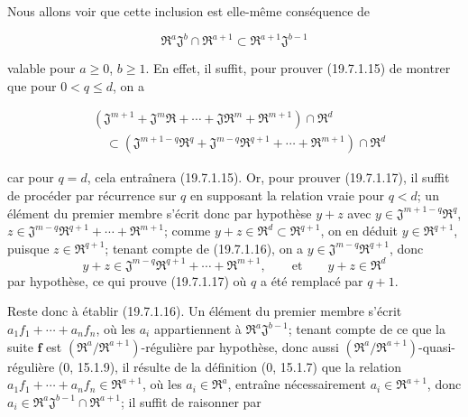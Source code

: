 Nous allons voir que cette inclusion est elle-même conséquence de
\begin{env}[19.7.1.16]
\label{IV.19.7.1.16}
\[
  \mathfrak R^a\mathfrak J^b\cap\mathfrak R^{a+1}\subset\mathfrak R^{a+1}\mathfrak J^{b-1}
\]
\end{env}
valable pour $a\geq0$, $b\geq1$. En effet, il suffit, pour prouver (19.7.1.15) de montrer que pour $0<q\leq d$, on a
\begin{env}[19.7.1.17]
\label{IV.19.7.1.17}
\[
\begin{aligned}
  &(\mathfrak J^{m+1}+\mathfrak J^m\mathfrak R+\cdots+\mathfrak J\mathfrak R^m+\mathfrak R^{m+1})\cap\mathfrak R^d\\
  &\quad\subset(\mathfrak J^{m+1-q}\mathfrak R^q+\mathfrak J^{m-q}\mathfrak R^{q+1}+\cdots+\mathfrak R^{m+1})\cap\mathfrak R^d
\end{aligned}
\]
\end{env}
car pour $q=d$, cela entraînera (19.7.1.15). Or, pour prouver (19.7.1.17), il suffit de procéder par récurrence sur $q$ en supposant la relation vraie pour $q<d$; un élément du premier membre s'écrit donc par hypothèse $y+z$ avec $y\in\mathfrak J^{m+1-q}\mathfrak R^q$, $z\in\mathfrak J^{m-q}\mathfrak R^{q+1}+\cdots+\mathfrak R^{m+1}$; comme $y+z\in\mathfrak R^d\subset\mathfrak R^{q+1}$, on en déduit $y\in\mathfrak R^{q+1}$, puisque $z\in\mathfrak R^{q+1}$; tenant compte de (19.7.1.16), on a $y\in\mathfrak J^{m-q}\mathfrak R^{q+1}$, donc
\[
  y+z\in\mathfrak J^{m-q}\mathfrak R^{q+1}+\cdots+\mathfrak R^{m+1},\qquad\text{et}\qquad y+z\in\mathfrak R^d
\]
par hypothèse, ce qui prouve (19.7.1.17) où $q$ a été remplacé par $q+1$.

Reste donc à établir (19.7.1.16). Un élément du premier membre s'écrit $a_1f_1+\cdots+a_nf_n$, où les $a_i$ appartiennent à $\mathfrak R^a\mathfrak J^{b-1}$; tenant compte de ce que la suite $\mathbf f$ est $(\mathfrak R^a/\mathfrak R^{a+1})$-régulière par hypothèse, donc aussi $(\mathfrak R^a/\mathfrak R^{a+1})$-quasi-régulière ($0$, 15.1.9), il résulte de la définition ($0$, 15.1.7) que la relation $a_1f_1+\cdots+a_nf_n\in\mathfrak R^{a+1}$, où les $a_i\in\mathfrak R^a$, entraîne nécessairement $a_i\in\mathfrak R^{a+1}$, donc $a_i\in\mathfrak R^a\mathfrak J^{b-1}\cap\mathfrak R^{a+1}$; il suffit de raisonner par

